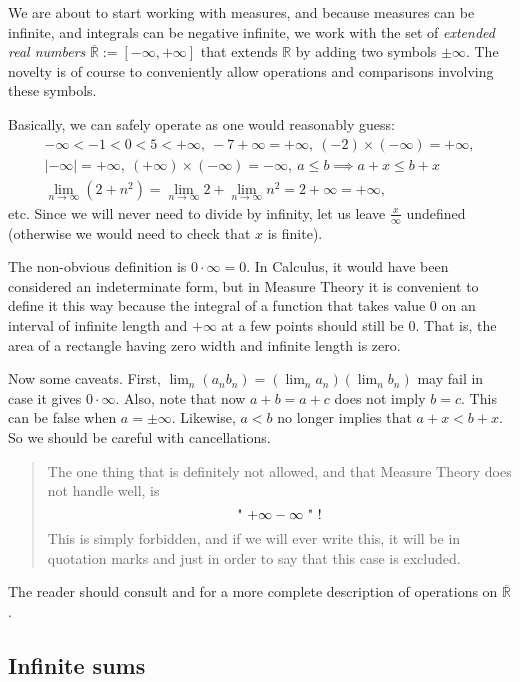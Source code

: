 \documentclass[
]{book}
\newcommand{\oR}{\overline{\R}}
\newcommand{\R}{\mathbb{R}}
\renewcommand*{\leq}{\leqslant}
\theoremstyle{definition}
\theoremstyle{definition}
\theoremstyle{definition}
\theoremstyle{definition}
\theoremstyle{remark}
\begin{document}
We are about to start working with measures, and because measures can be
infinite, and integrals can be negative infinite, we work with the set
of \emph{extended real numbers} \(\oR := [-\infty,+\infty]\) that extends \(\R\)
by adding two symbols \(\pm \infty\). The novelty is of course to
conveniently allow operations and comparisons involving these symbols.

Basically, we can safely operate as one would reasonably guess:
\[\begin{gathered}
-\infty < -1 < 0 < 5 < +\infty,
\
-7 +\infty = +\infty,
\
(-2) \times (-\infty) = +\infty,
\\
|-\infty| = +\infty,
\
(+\infty) \times (-\infty) = -\infty,
\
a \leq b \implies a+x \leq b+x
\\
\lim_{n\to\infty} (2+n^2)
=
\lim_{n\to\infty} 2
+
\lim_{n\to\infty} n^2
=
2 + \infty
=
+\infty,\end{gathered}\] etc. Since we will never need to divide by
infinity, let us leave \(\frac{x}{\infty}\) undefined (otherwise we would
need to check that \(x\) is finite).

The non-obvious definition is \(0 \cdot \infty = 0\). In Calculus, it
would have been considered an indeterminate form, but in Measure Theory
it is convenient to define it this way because the integral of a
function that takes value \(0\) on an interval of infinite length and
\(+\infty\) at a few points should still be \(0\). That is, the area of a
rectangle having zero width and infinite length is zero.

Now some caveats. First, \(\lim_n (a_n b_n) = (\lim_n a_n)(\lim_n b_n)\)
may fail in case it gives \(0 \cdot \infty\). Also, note that now
\(a+b = a+c\) does not imply \(b=c\). This can be false when \(a=\pm \infty\).
Likewise, \(a<b\) no longer implies that \(a+x < b+x\). So we should be
careful with cancellations.

\begin{quote}
The one thing that is definitely not allowed, and that Measure Theory
does not handle well, is \[\text{" $ +\infty -\infty $ " !}\] This is
simply forbidden, and if we will ever write this, it will be in
quotation marks and just in order to say that this case is excluded.
\end{quote}

The reader should consult \citep[ §§B.4--B.6]{Cohn13} and \citep[ p.~xi]{Tao11} for a
more complete description of operations on \(\oR\).

\hypertarget{infinite-sums}{%
\subsection{Infinite sums}\label{infinite-sums}}
\end{document}
